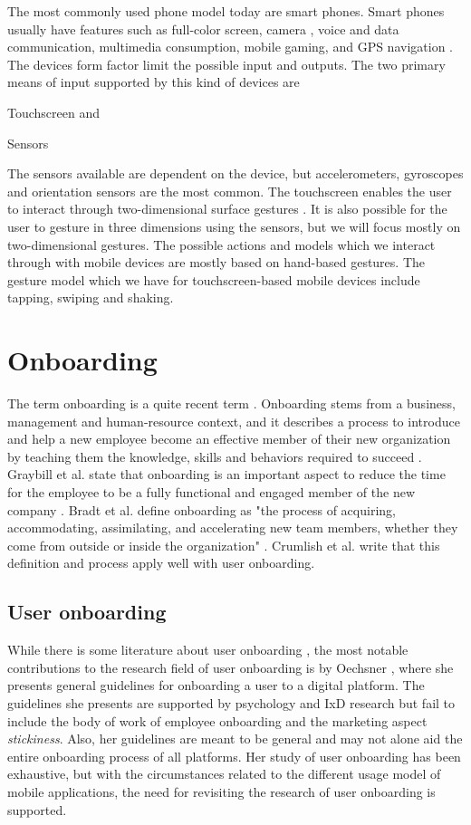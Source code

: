 The most commonly used phone model today are smart phones. Smart phones usually have features such as full-color screen, camera \cite{Yu2012}, voice and data communication, multimedia consumption, mobile gaming, and GPS navigation \cite{Ruiz2011}. The devices form factor limit the possible input and outputs. The two primary means of input supported by this kind of devices are
\begin{enumerate*}[label=(\(\arabic*\))]
  \item Touchscreen and
  \item Sensors
\end{enumerate*}

The sensors available are dependent on the device, but accelerometers, gyroscopes and orientation sensors are the most common. The touchscreen enables the user to interact through two-dimensional surface gestures \cite{Ruiz2011}. It is also possible for the user to gesture in three dimensions using the sensors, but we will focus mostly on two-dimensional gestures. The possible actions and models which we interact through with mobile devices are mostly based on hand-based gestures. The gesture model which we have for touchscreen-based mobile devices include tapping, swiping and shaking.

\section{Onboarding}
The term onboarding is a quite recent term \cite{Dai2007}. Onboarding stems from a business, management and human-resource context, and it describes a process to introduce and help a new employee become an effective member of their new organization by teaching them the knowledge, skills and behaviors required to succeed \cite{Bauer2011}. Graybill et al. state that onboarding is an important aspect to reduce the time for the employee to be a fully functional and engaged member of the new company \cite{GraybillJolieO;HudsonCarpenterMariaTaesil;OffordJeromeJr;PiorunMary;Shaffer2013}. Bradt et al. define onboarding as "the process of acquiring, accommodating, assimilating, and accelerating new team members, whether they come from outside or inside the organization" \cite{Bradt2009}. Crumlish et al. \cite{Crumlish2009} write that this definition and process apply well with user onboarding.

\subsection{User onboarding}
While there is some literature about user onboarding \cite{Thomsen2016}, the most notable contributions to the research field of user onboarding is by Oechsner \cite{Oechsner2016}, where she presents general guidelines for onboarding a user to a digital platform. The guidelines she presents are supported by psychology and IxD research but fail to include the body of work of employee onboarding and the marketing aspect \textit{stickiness}. Also, her guidelines are meant to be general and may not alone aid the entire onboarding process of all platforms. Her study of user onboarding has been exhaustive, but with the circumstances related to the different usage model of mobile applications, the need for revisiting the research of user onboarding is supported.
